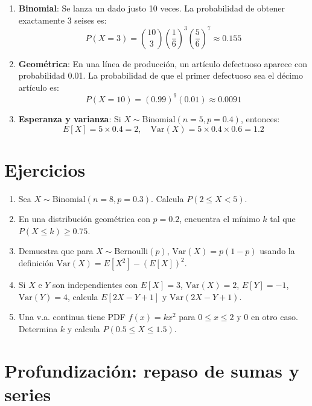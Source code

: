 \documentclass[letterpaper, 12pt]{article}
\begin{document}
	\begin{enumerate}
		\item \textbf{Binomial}: Se lanza un dado justo 10 veces. La probabilidad de obtener exactamente 3 seises es:
		\[ P(X = 3) = \binom{10}{3} \left(\frac{1}{6}\right)^3 \left(\frac{5}{6}\right)^7 \approx 0.155 \]
		
		\item \textbf{Geométrica}: En una línea de producción, un artículo defectuoso aparece con probabilidad 0.01. La probabilidad de que el primer defectuoso sea el décimo artículo es:
		\[ P(X = 10) = (0.99)^9 (0.01) \approx 0.0091 \]
		
		\item \textbf{Esperanza y varianza}: Si $X \sim \text{Binomial}(n=5, p=0.4)$, entonces:
		\[ E[X] = 5 \times 0.4 = 2, \quad \text{Var}(X) = 5 \times 0.4 \times 0.6 = 1.2 \]
	\end{enumerate}
	
	\section{Ejercicios}
	
	\begin{enumerate}
		\item Sea $X \sim \text{Binomial}(n=8, p=0.3)$. Calcula $P(2 \leq X < 5)$.
		
		\item En una distribución geométrica con $p=0.2$, encuentra el mínimo $k$ tal que $P(X \leq k) \geq 0.75$.
		
		\item Demuestra que para $X \sim \text{Bernoulli}(p)$, $\text{Var}(X) = p(1-p)$ usando la definición $\text{Var}(X) = E[X^2] - (E[X])^2$.
		
		\item Si $X$ e $Y$ son independientes con $E[X] = 3$, $\text{Var}(X) = 2$, $E[Y] = -1$, $\text{Var}(Y) = 4$, calcula $E[2X - Y + 1]$ y $\text{Var}(2X - Y + 1)$.
		
		\item Una v.a. continua tiene PDF $f(x) = kx^2$ para $0 \leq x \leq 2$ y 0 en otro caso. Determina $k$ y calcula $P(0.5 \leq X \leq 1.5)$.
	\end{enumerate}
	
	\section{Profundización: repaso de sumas y series}
	
\end{document}
